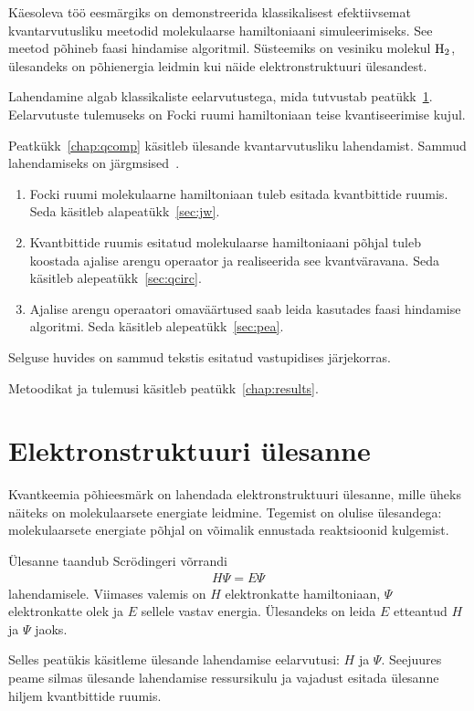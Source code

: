 \documentclass[12pt]{report}
\begin{document}
Käesoleva töö eesmärgiks on demonstreerida klassikalisest efektiivsemat kvantarvutusliku meetodid molekulaarse hamiltoniaani simuleerimiseks.
See meetod põhineb faasi hindamise algoritmil.
Süsteemiks on vesiniku molekul \(\rm H_2\), ülesandeks on põhienergia leidmin kui näide elektronstruktuuri ülesandest.

Lahendamine algab klassikaliste eelarvutustega, mida tutvustab peatükk~\ref{chap:qchem}.
Eelarvutuste tulemuseks on Focki ruumi hamiltoniaan teise kvantiseerimise kujul.

Peatkükk~\ref{chap:qcomp} käsitleb ülesande kvantarvutusliku lahendamist.
Sammud lahendamiseks on järgmsised~\cite{whitfield+etal2011}.

\begin{enumerate}
    \item Focki ruumi molekulaarne hamiltoniaan tuleb esitada kvantbittide ruumis.
    Seda käsitleb alapeatükk~\ref{sec:jw}.
    \item Kvantbittide ruumis esitatud molekulaarse hamiltoniaani põhjal tuleb koostada ajalise arengu operaator ja realiseerida see kvantväravana.
    Seda käsitleb alepeatükk~\ref{sec:qcirc}.
    \item Ajalise arengu operaatori omaväärtused saab leida kasutades faasi hindamise algoritmi.
    Seda käsitleb alepeatükk~\ref{sec:pea}.
\end{enumerate}
Selguse huvides on sammud tekstis esitatud vastupidises järjekorras.

Metoodikat ja tulemusi käsitleb peatükk~\ref{chap:results}.

\chapter{Elektronstruktuuri ülesanne}\label{chap:qchem}

Kvantkeemia põhieesmärk on lahendada elektronstruktuuri ülesanne, mille üheks näiteks on molekulaarsete energiate leidmine.
Tegemist on olulise ülesandega: molekulaarsete energiate põhjal on võimalik ennustada reaktsioonid kulgemist.

Ülesanne taandub Scrödingeri võrrandi
\begin{align}
    H \Psi = E\Psi
\end{align}
lahendamisele.
Viimases valemis on \(H\) elektronkatte hamiltoniaan, \(\Psi\) elektronkatte olek ja \(E\) sellele vastav energia.
Ülesandeks on leida \(E\) etteantud \(H\) ja \(\Psi\) jaoks.

Selles peatükis käsitleme ülesande lahendamise eelarvutusi: \(H\) ja \(\Psi\).
Seejuures peame silmas ülesande lahendamise ressursikulu ja vajadust esitada ülesanne hiljem kvantbittide ruumis.
\end{document}
